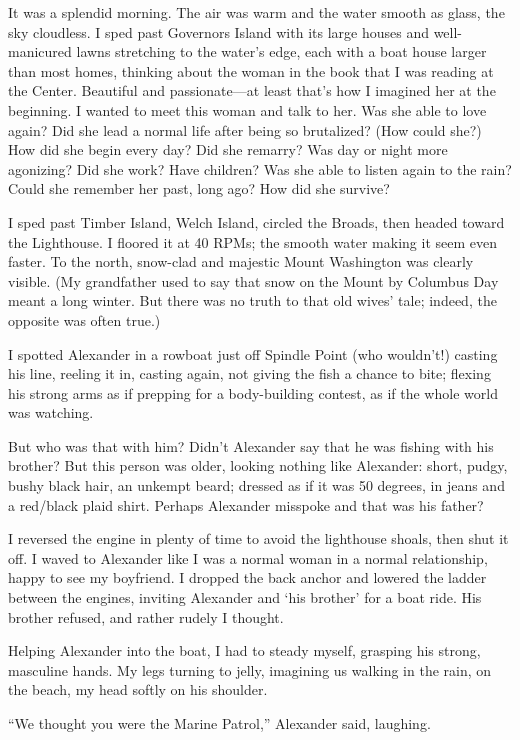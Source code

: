 It was a splendid morning. The air was warm and the water smooth as
glass, the sky cloudless. I sped past Governors Island with its large
houses and well-manicured lawns stretching to the water's edge, each
with a boat house larger than most homes, thinking about the woman in
the book that I was reading at the Center. Beautiful and passionate---at
least that's how I imagined her at the beginning. I wanted to meet this
woman and talk to her. Was she able to love again? Did she lead a normal
life after being so brutalized? (How could she?) How did she begin every
day? Did she remarry? Was day or night more agonizing? Did she work?
Have children? Was she able to listen again to the rain? Could she
remember her past, long ago? How did she survive?

I sped past Timber Island, Welch Island, circled the Broads, then headed
toward the Lighthouse. I floored it at 40 RPMs; the smooth water making
it seem even faster. To the north, snow-clad and majestic Mount
Washington was clearly visible. (My grandfather used to say that snow on
the Mount by Columbus Day meant a long winter. But there was no truth to
that old wives' tale; indeed, the opposite was often true.)

I spotted Alexander in a rowboat just off Spindle Point (who wouldn't!)
casting his line, reeling it in, casting again, not giving the fish a
chance to bite; flexing his strong arms as if prepping for a
body-building contest, as if the whole world was watching.

But who was that with him? Didn't Alexander say that he was fishing with
his brother? But this person was older, looking nothing like Alexander:
short, pudgy, bushy black hair, an unkempt beard; dressed as if it was
50 degrees, in jeans and a red/black plaid shirt. Perhaps Alexander
misspoke and that was his father?

I reversed the engine in plenty of time to avoid the lighthouse shoals,
then shut it off. I waved to Alexander like I was a normal woman in a
normal relationship, happy to see my boyfriend. I dropped the back
anchor and lowered the ladder between the engines, inviting Alexander
and `his brother' for a boat ride. His brother refused, and rather
rudely I thought.

Helping Alexander into the boat, I had to steady myself, grasping his
strong, masculine hands. My legs turning to jelly, imagining us walking
in the rain, on the beach, my head softly on his shoulder.

``We thought you were the Marine Patrol,'' Alexander said, laughing.

